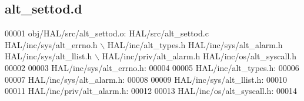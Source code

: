 \subsection{alt\+\_\+settod.\+d}
\label{alt__settod_8d_source}

\begin{DoxyCode}
00001 obj/HAL/src/alt\_settod.o: HAL/src/alt\_settod.c HAL/inc/sys/alt_errno.h \(\backslash\)
 HAL/inc/alt\_types.h HAL/inc/sys/alt_alarm.h HAL/inc/sys/alt_llist.h \(\backslash\)
 HAL/inc/priv/alt_alarm.h HAL/inc/os/alt\_syscall.h
00002 
00003 HAL/inc/sys/alt_errno.h:
00004 
00005 HAL/inc/alt\_types.h:
00006 
00007 HAL/inc/sys/alt_alarm.h:
00008 
00009 HAL/inc/sys/alt_llist.h:
00010 
00011 HAL/inc/priv/alt_alarm.h:
00012 
00013 HAL/inc/os/alt\_syscall.h:
00014 \end{DoxyCode}
